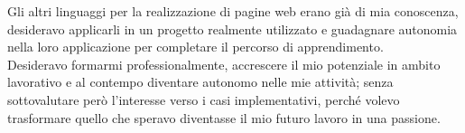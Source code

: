 	Gli altri linguaggi per la realizzazione di pagine web erano già di mia conoscenza, desideravo applicarli in un progetto realmente utilizzato e guadagnare autonomia nella loro applicazione per completare il percorso di apprendimento.\\
	
	Desideravo formarmi professionalmente, accrescere il mio potenziale in ambito lavorativo e al contempo diventare autonomo nelle mie attività; senza	sottovalutare però l'interesse verso i casi implementativi, perché volevo trasformare quello che speravo diventasse il mio futuro lavoro in una passione.